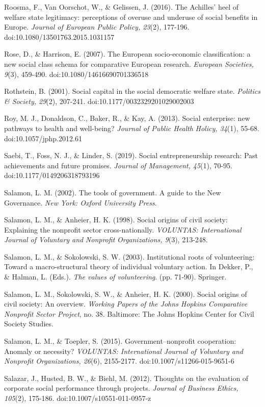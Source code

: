 \documentclass{article}
\begin{document}
Roosma, F., Van Oorschot, W., \& Gelissen, J. (2016). The Achilles' heel of welfare state legitimacy: perceptions of overuse and underuse of social benefits in Europe. \emph{Journal of European Public Policy, 23}(2), 177-196. doi:10.1080/13501763.2015.1031157

Rose, D., \& Harrison, E. (2007). The European socio-economic classification: a new social class schema for comparative European research. \emph{European Societies, 9}(3), 459-490. doi:10.1080/14616690701336518

Rothstein, B. (2001). Social capital in the social democratic welfare state. \emph{Politics \& Society, 29}(2), 207-241. doi:10.1177/0032329201029002003

Roy, M. J., Donaldson, C., Baker, R., \& Kay, A. (2013). Social enterprise: new pathways to health and well-being? \emph{Journal of Public Health }\emph{Holicy}\emph{, 34}(1), 55-68. doi:10.1057/jphp.2012.61

Saebi, T., Foss, N. J., \& Linder, S. (2019). Social entrepreneurship research: Past achievements and future promises. \emph{Journal of Management, 45}(1), 70-95. doi:10.1177/0149206318793196

Salamon, L. M. (2002). The tools of government. A guide to the New Governance. \emph{New York: Oxford University Press}. 

Salamon, L. M., \& Anheier, H. K. (1998). Social origins of civil society: Explaining the nonprofit sector cross-nationally. \emph{VOLUNTAS: International Journal of Voluntary and }\emph{Nonprofit}\emph{ Organizations, 9}(3), 213-248. 

Salamon, L. M., \& Sokolowski, S. W. (2003). Institutional roots of volunteering: Toward a macro-structural theory of individual voluntary action. In Dekker, P., \& Halman, L. (Eds.). \emph{The values of volunteering}. (pp. 71-90). Springer.

Salamon, L. M., Sokolowski, S. W., \& Anheier, H. K. (2000). Social origins of civil society: An overview. \emph{Working Papers of the Johns Hopkins Comparative }\emph{Nonprofit}\emph{ Sector Project}, no. 38. Baltimore: The Johns Hopkins Center for Civil Society Studies.

Salamon, L. M., \& Toepler, S. (2015). Government--nonprofit cooperation: Anomaly or necessity? \emph{VOLUNTAS: International Journal of Voluntary and }\emph{Nonprofit}\emph{ Organizations, 26}(6), 2155-2177. doi:10.1007/s11266-015-9651-6

Salazar, J., Husted, B. W., \& Biehl, M. (2012). Thoughts on the evaluation of corporate social performance through projects. \emph{Journal of Business Ethics, 105}(2), 175-186. doi:10.1007/s10551-011-0957-z
\end{document}
